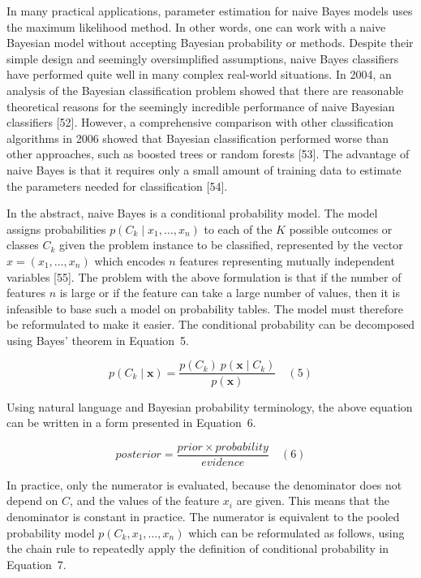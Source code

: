 \documentclass[preprint,12pt]{elsarticle}
\begin{document}
In many practical applications, parameter estimation for naive Bayes models uses the maximum likelihood method. In other words, one can work with a naive Bayesian model without accepting Bayesian probability or methods. Despite their simple design and seemingly oversimplified assumptions, naive Bayes classifiers have performed quite well in many complex real-world situations. In 2004, an analysis of the Bayesian classification problem showed that there are reasonable theoretical reasons for the seemingly incredible performance of naive Bayesian classifiers [52]. However, a comprehensive comparison with other classification algorithms in 2006 showed that Bayesian classification performed worse than other approaches, such as boosted trees or random forests [53]. The advantage of naive Bayes is that it requires only a small amount of training data to estimate the parameters needed for classification [54].

In the abstract, naive Bayes is a conditional probability model. The model assigns probabilities $p(C_{k}\mid x_{1},\ldots, x_{n})$ to each of the $K$ possible outcomes or classes $C_{k}$ given the problem instance to be classified, represented by the vector $x = (x_{1},\ldots, x_{n})$ which encodes $n$ features representing mutually independent variables [55]. The problem with the above formulation is that if the number of features $n$ is large or if the feature can take a large number of values, then it is infeasible to base such a model on probability tables. The model must therefore be reformulated to make it easier. The conditional probability can be decomposed using Bayes' theorem in Equation~5.

\begin{equation}
	p(C_{k}\mid \mathbf{x})={\frac{p(C_{k})\ p(\mathbf{x} \mid C_{k})}{p(\mathbf{x})}}
	\quad\left(5\right)
\end{equation}

Using natural language and Bayesian probability terminology, the above equation can be written in a form presented in Equation~6.

\begin{equation}
	posterior = \frac{prior \times probability}{evidence}
	\quad\left(6\right)
\end{equation}

In practice, only the numerator is evaluated, because the denominator does not depend on $C$, and the values of the feature $x_{i}$ are given. This means that the denominator is constant in practice. The numerator is equivalent to the pooled probability model $p(C_{k},x_{1},\ldots,x_{n})$ which can be reformulated as follows, using the chain rule to repeatedly apply the definition of conditional probability in Equation~7.
\end{document}
